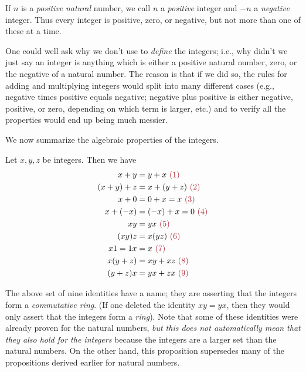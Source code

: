 \begin{note}
If \(n\) is a \emph{positive} \emph{natural} number, we call \(n\) a \emph{positive} integer and \(-n\) a \emph{negative} integer.
Thus every integer is positive, zero, or negative, but not more than one of these at a time.
\end{note}

\begin{note}
One could well ask why we don’t use  to \emph{define} the integers;
i.e., why didn’t we just say an integer is anything which is either a positive natural number, zero, or the negative of a natural number.
The reason is that if we did so, the rules for adding and multiplying integers would split into many different cases
(e.g., negative times positive equals negative; negative plus positive is either negative, positive, or zero, depending on which term is larger, etc.)
and to verify all the properties would end up being much messier.
\end{note}

We now summarize the algebraic properties of the integers.

\begin{proposition}  \label{prop 4.1.6}
Let \(x, y, z\) be integers.
Then we have
\begin{align*}
          x + y & = y + x \MAROON{\ (1)} \\
    (x + y) + z & = x + (y + z) \MAROON{\ (2)} \\
          x + 0 & = 0 + x = x \MAROON{\ (3)} \\
       x + (-x) & = (-x) + x = 0 \MAROON{\ (4)} \\
             xy & = yx \MAROON{\ (5)} \\
          (xy)z & = x(yz) \MAROON{\ (6)} \\
        x1 = 1x & = x \MAROON{\ (7)} \\
       x(y + z) & = xy + xz \MAROON{\ (8)} \\
       (y + z)x & = yx + zx \MAROON{\ (9)}
\end{align*}
\end{proposition}

\begin{remark} \label{remark 4.1.7}
The above set of nine identities have a name; they are asserting that the integers form a \emph{commutative ring}.
(If one deleted the identity \(xy = yx\), then they would only assert that the integers form a \emph{ring}).
Note that some of these identities were already proven for the natural numbers, \emph{but this does not automatically mean that they also hold for the integers} because the integers are a larger set than the natural numbers.
On the other hand, this proposition supersedes many of the propositions derived earlier for natural numbers.
\end{remark}

